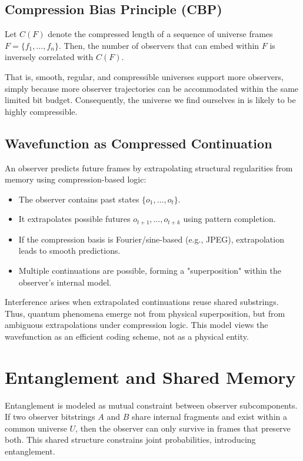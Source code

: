 \documentclass[12pt]{article}
\begin{document}
\subsection{Compression Bias Principle (CBP)}

Let $C(F)$ denote the compressed length of a sequence of universe frames $F = \{f_1, \ldots, f_n\}$. Then, the number of observers that can embed within $F$ is inversely correlated with $C(F)$.

That is, smooth, regular, and compressible universes support more observers, simply because more observer trajectories can be accommodated within the same limited bit budget. Consequently, the universe we find ourselves in is likely to be highly compressible.

\subsection{Wavefunction as Compressed Continuation}

An observer predicts future frames by extrapolating structural regularities from memory using compression-based logic:

\begin{itemize}
    \item The observer contains past states $\{o_1, \ldots, o_t\}$.
    \item It extrapolates possible futures $o_{t+1}, \ldots, o_{t+k}$ using pattern completion.
    \item If the compression basis is Fourier/sine-based (e.g., JPEG), extrapolation leads to smooth predictions.
    \item Multiple continuations are possible, forming a "superposition" within the observer's internal model.
\end{itemize}

Interference arises when extrapolated continuations reuse shared substrings. Thus, quantum phenomena emerge not from physical superposition, but from ambiguous extrapolations under compression logic. This model views the wavefunction as an efficient coding scheme, not as a physical entity.

\section{Entanglement and Shared Memory}

Entanglement is modeled as mutual constraint between observer subcomponents. If two observer bitstrings $A$ and $B$ share internal fragments and exist within a common universe $U$, then the observer can only survive in frames that preserve both. This shared structure constrains joint probabilities, introducing entanglement.
\end{document}
